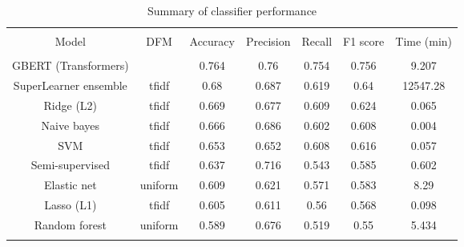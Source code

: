 
\begin{table}[!htbp] \centering 
  \caption{Summary of classifier performance} 
  \label{tab:tm-eval} 
\begin{tabular}{@{\extracolsep{5pt}} ccccccc} 
\\[-1.8ex]\hline 
\hline \\[-1.8ex] 
Model & DFM & Accuracy & Precision & Recall & F1 score & Time (min) \\ 
\hline \\[-1.8ex] 
GBERT (Transformers) &  & 0.764 & 0.76 & 0.754 & 0.756 & 9.207 \\ 
SuperLearner ensemble & tfidf & 0.68 & 0.687 & 0.619 & 0.64 & 12547.28 \\ 
Ridge (L2) & tfidf & 0.669 & 0.677 & 0.609 & 0.624 & 0.065 \\ 
Naive bayes & tfidf & 0.666 & 0.686 & 0.602 & 0.608 & 0.004 \\ 
SVM & tfidf & 0.653 & 0.652 & 0.608 & 0.616 & 0.057 \\ 
Semi-supervised & tfidf & 0.637 & 0.716 & 0.543 & 0.585 & 0.602 \\ 
Elastic net & uniform & 0.609 & 0.621 & 0.571 & 0.583 & 8.29 \\ 
Lasso (L1) & tfidf & 0.605 & 0.611 & 0.56 & 0.568 & 0.098 \\ 
Random forest & uniform & 0.589 & 0.676 & 0.519 & 0.55 & 5.434 \\ 
\hline \\[-1.8ex] 
\end{tabular} 
\end{table} 
